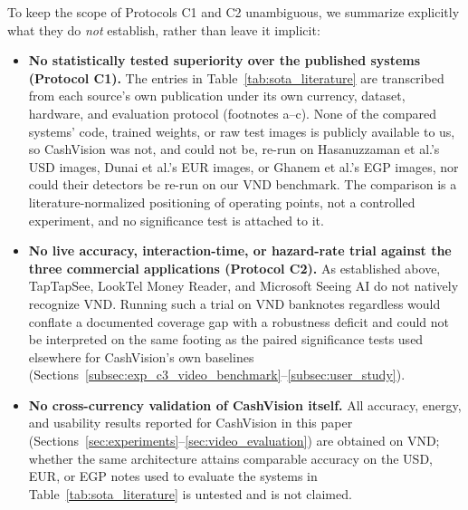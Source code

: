 \documentclass[final,5p,times,twocolumn,authoryear]{elsarticle}
\begin{document}
To keep the scope of Protocols C1 and C2 unambiguous, we summarize explicitly what they do \emph{not} establish, rather than leave it implicit:
\begin{itemize}
    \item \textbf{No statistically tested superiority over the published systems (Protocol C1).} The entries in Table~\ref{tab:sota_literature} are transcribed from each source's own publication under its own currency, dataset, hardware, and evaluation protocol (footnotes a--c). None of the compared systems' code, trained weights, or raw test images is publicly available to us, so CashVision was not, and could not be, re-run on Hasanuzzaman et al.'s USD images, Dunai et al.'s EUR images, or Ghanem et al.'s EGP images, nor could their detectors be re-run on our VND benchmark. The comparison is a literature-normalized positioning of operating points, not a controlled experiment, and no significance test is attached to it.
    \item \textbf{No live accuracy, interaction-time, or hazard-rate trial against the three commercial applications (Protocol C2).} As established above, TapTapSee, LookTel Money Reader, and Microsoft Seeing AI do not natively recognize VND. Running such a trial on VND banknotes regardless would conflate a documented coverage gap with a robustness deficit and could not be interpreted on the same footing as the paired significance tests used elsewhere for CashVision's own baselines (Sections~\ref{subsec:exp_c3_video_benchmark}--\ref{subsec:user_study}).
    \item \textbf{No cross-currency validation of CashVision itself.} All accuracy, energy, and usability results reported for CashVision in this paper (Sections~\ref{sec:experiments}--\ref{sec:video_evaluation}) are obtained on VND; whether the same architecture attains comparable accuracy on the USD, EUR, or EGP notes used to evaluate the systems in Table~\ref{tab:sota_literature} is untested and is not claimed.
\end{itemize}
\end{document}
